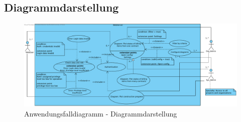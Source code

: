 \clearpage

\subsection{Diagrammdarstellung}

\begin{figure}[h]
	\centering
	\includegraphics[width=\linewidth]{img/diagrams/diagramme_verwalten.pdf}
	\caption{Anwendungsfalldiagramm - Diagrammdarstellung}
	\label{fig:anwendungsfalldiagramm-dia-verwaltung}
\end{figure}

\newpage

